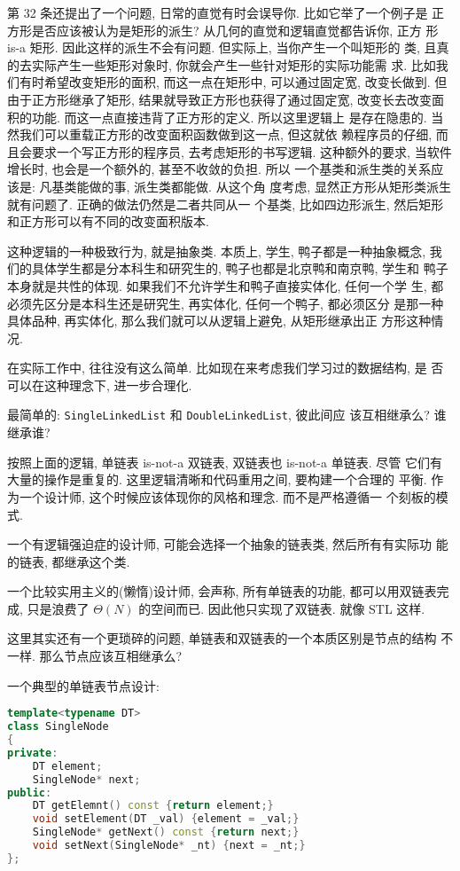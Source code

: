 \documentclass[a4paper]{ctexart}
\theoremstyle{definition}
\theoremstyle{definition}
\begin{document}
第 32 条还提出了一个问题, 日常的直觉有时会误导你. 比如它举了一个例子是
正方形是否应该被认为是矩形的派生? 从几何的直觉和逻辑直觉都告诉你, 正方
形 is-a 矩形. 因此这样的派生不会有问题. 但实际上, 当你产生一个叫矩形的
类, 且真的去实际产生一些矩形对象时, 你就会产生一些针对矩形的实际功能需
求. 比如我们有时希望改变矩形的面积, 而这一点在矩形中, 可以通过固定宽,
改变长做到. 但由于正方形继承了矩形, 结果就导致正方形也获得了通过固定宽,
改变长去改变面积的功能. 而这一点直接违背了正方形的定义. 所以这里逻辑上
是存在隐患的. 当然我们可以重载正方形的改变面积函数做到这一点, 但这就依
赖程序员的仔细, 而且会要求一个写正方形的程序员, 去考虑矩形的书写逻辑.
这种额外的要求, 当软件增长时, 也会是一个额外的, 甚至不收敛的负担. 所以
一个基类和派生类的关系应该是: 凡基类能做的事, 派生类都能做.  从这个角
度考虑, 显然正方形从矩形类派生就有问题了. 正确的做法仍然是二者共同从一
个基类, 比如四边形派生, 然后矩形和正方形可以有不同的改变面积版本.

这种逻辑的一种极致行为, 就是抽象类. 本质上, 学生, 鸭子都是一种抽象概念,
我们的具体学生都是分本科生和研究生的, 鸭子也都是北京鸭和南京鸭, 学生和
鸭子本身就是共性的体现. 如果我们不允许学生和鸭子直接实体化, 任何一个学
生, 都必须先区分是本科生还是研究生, 再实体化, 任何一个鸭子, 都必须区分
是那一种具体品种, 再实体化, 那么我们就可以从逻辑上避免, 从矩形继承出正
方形这种情况. 

在实际工作中, 往往没有这么简单. 比如现在来考虑我们学习过的数据结构, 是
否可以在这种理念下, 进一步合理化.

最简单的: \verb|SingleLinkedList| 和 \verb|DoubleLinkedList|, 彼此间应
该互相继承么? 谁继承谁?

按照上面的逻辑, 单链表 is-not-a 双链表, 双链表也 is-not-a 单链表. 尽管
它们有大量的操作是重复的. 这里逻辑清晰和代码重用之间, 要构建一个合理的
平衡. 作为一个设计师, 这个时候应该体现你的风格和理念. 而不是严格遵循一
个刻板的模式. 

一个有逻辑强迫症的设计师, 可能会选择一个抽象的链表类, 然后所有有实际功
能的链表, 都继承这个类.

一个比较实用主义的(懒惰)设计师, 会声称, 所有单链表的功能, 都可以用双链表完成,
只是浪费了 $\Theta(N)$ 的空间而已. 因此他只实现了双链表. 就像 STL 这样.

这里其实还有一个更琐碎的问题, 单链表和双链表的一个本质区别是节点的结构
不一样. 那么节点应该互相继承么?

一个典型的单链表节点设计:

\begin{lstlisting}[language=C++]
template<typename DT>
class SingleNode
{
private:
    DT element;
    SingleNode* next;
public:
    DT getElemnt() const {return element;}
    void setElement(DT _val) {element = _val;}
    SingleNode* getNext() const {return next;}
    void setNext(SingleNode* _nt) {next = _nt;} 
};
\end{lstlisting}
\end{document}
